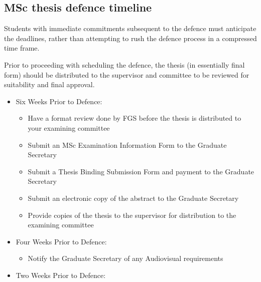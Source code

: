 \documentclass{article}
\begin{document}
\subsection{MSc thesis defence timeline}

Students with immediate commitments subsequent to the defence must anticipate
the deadlines, rather than attempting to rush the defence process in a
compressed time frame.

Prior to proceeding with scheduling the defence, the thesis (in essentially
final form) should be distributed to the supervisor and committee to be
reviewed for suitability and final approval.

\begin{itemize}
    \item Six Weeks Prior to Defence:

        \begin{itemize}

            \item Have a format review done by FGS before the thesis is
                distributed to your examining committee

            \item Submit an MSc Examination Information Form to the Graduate
                Secretary

            \item Submit a Thesis Binding Submission Form and payment to the
                Graduate Secretary

            \item Submit an electronic copy of the abstract to the Graduate
                Secretary

            \item Provide copies of the thesis to the supervisor for
                distribution to the examining committee

        \end{itemize}

    \item Four Weeks Prior to Defence:
        \begin{itemize}

            \item Notify the Graduate Secretary of any Audiovisual requirements

        \end{itemize}

    \item Two Weeks Prior to Defence:
        \begin{itemize}


\end{itemize}
\end{itemize}
\end{document}

